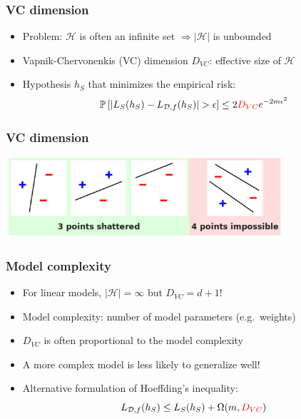 \documentclass[10pt]{beamer}
\begin{document}
\begin{frame}
  \frametitle{VC dimension}
  \begin{itemize}
	\item Problem: $\mathcal{H}$ is often an {\color{red} infinite set} $\Rightarrow |\mathcal{H}|$ is {\color{red} unbounded}
	\item Vapnik-Chervonenkis (VC) dimension $D_{VC}$: {\color{green} effective size} of $\mathcal{H}$
	\item Hypothesis $h_S$ that minimizes the empirical risk:
	\[
	\mathbb{P}\left[|L_S(h_S) - L_{\mathcal{D},f}(h_S)| > \epsilon\right] \leq 2 {\color{red} D_{VC}}e^{-2m\epsilon^2}
	\]
  \end{itemize}
\end{frame}

\begin{frame}
  \frametitle{VC dimension}
  \begin{center}
  \includegraphics[height=3cm]{images/vcdim.png}
  \end{center}
\end{frame}

\begin{frame}
  \frametitle{Model complexity}
  \begin{itemize}
	\item For linear models, $|\mathcal{H}|=\infty$ but {\color{green} $D_{VC}=d+1$}!
	\item {\color{red} Model complexity}: number of model parameters (e.g.~weights)
	\item $D_{VC}$ is often proportional to the model complexity
	\item A {\color{blue} more complex model} is {\color{purple} less likely to generalize well}!
	\item {\color{cyan} Alternative formulation} of Hoeffding's inequality:
	\[
	L_{\mathcal{D},f}(h_S) \leq L_S(h_S) + \Omega(m,{\color{red} D_{VC}})
	\]
  \end{itemize}
\end{frame}
\end{document}
